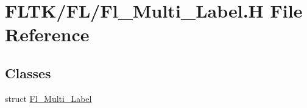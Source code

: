\hypertarget{_fl___multi___label_8_h}{}\section{F\+L\+T\+K/\+F\+L/\+Fl\+\_\+\+Multi\+\_\+\+Label.H File Reference}
\label{_fl___multi___label_8_h}
\subsection*{Classes}
\begin{DoxyCompactItemize}
\item 
struct \hyperlink{struct_fl___multi___label}{Fl\+\_\+\+Multi\+\_\+\+Label}
\end{DoxyCompactItemize}
